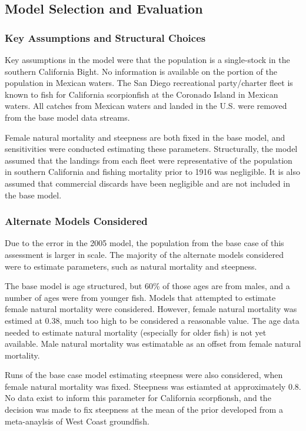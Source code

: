 \documentclass[12pt,]{article}
\begin{document}
\subsection{Model Selection and
Evaluation}\label{model-selection-and-evaluation}

\subsubsection{Key Assumptions and Structural
Choices}\label{key-assumptions-and-structural-choices}

Key assumptions in the model were that the population is a single-stock
in the southern California Bight. No information is available on the
portion of the population in Mexican waters. The San Diego recreational
party/charter fleet is known to fish for California scorpionfish at the
Coronado Island in Mexican waters. All catches from Mexican waters and
landed in the U.S. were removed from the base model data streams.

Female natural mortality and steepness are both fixed in the base model,
and sensitivities were conducted estimating these parameters.
Structurally, the model assumed that the landings from each fleet were
representative of the population in southern California and fishing
mortality prior to 1916 was negligible. It is also assumed that
commercial discards have been negligible and are not included in the
base model.

\subsubsection{Alternate Models
Considered}\label{alternate-models-considered}

Due to the error in the 2005 model, the population from the base case of
this assessment is larger in scale. The majority of the alternate models
considered were to estimate parameters, such as natural mortality and
steepness.

The base model is age structured, but 60\% of those ages are from males,
and a number of ages were from younger fish. Models that attempted to
estimate female natural mortality were considered. However, female
natural mortality was estimed at 0.38, much too high to be considered a
reasonable value. The age data needed to estimate natural mortality
(especially for older fish) is not yet available. Male natural mortality
was estimatable as an offset from female natural mortality.

Runs of the base case model estimating steepness were also considered,
when female natural mortality was fixed. Steepness was estiamted at
approximately 0.8. No data exist to inform this parameter for California
scorpfionsh, and the decision was made to fix steepness at the mean of
the prior developed from a meta-anaylsis of West Coast groundfish.
\end{document}
